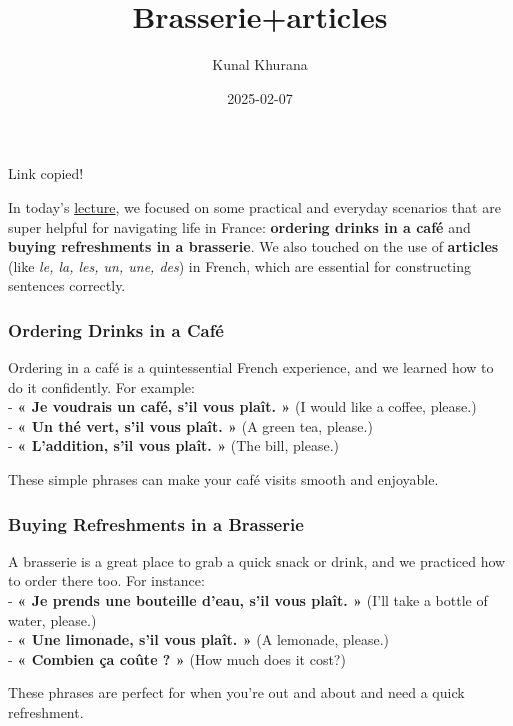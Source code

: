 \documentclass[
  16pt,
  letterpaper,
  DIV=11,
  numbers=noendperiod]{scrartcl}
\title{Brasserie+articles}
\author{Kunal Khurana}
\date{2025-02-07}
\begin{document}
\maketitle


\label{copy-message}{Link copied!}

\label{react-root}

In today's
\href{https://drive.google.com/file/d/1ESQ5L5H1BAVH96tB-sZq4b_lJrkGgsdO/view?usp=drive_link}{lecture},
we focused on some practical and everyday scenarios that are super
helpful for navigating life in France: \textbf{ordering drinks in a
café} and \textbf{buying refreshments in a brasserie}. We also touched
on the use of \textbf{articles} (like \emph{le, la, les, un, une, des})
in French, which are essential for constructing sentences correctly.

\subsubsection{Ordering Drinks in a
Café}\label{ordering-drinks-in-a-cafuxe9}

Ordering in a café is a quintessential French experience, and we learned
how to do it confidently. For example:\\
- \textbf{« Je voudrais un café, s'il vous plaît. »} (I would like a
coffee, please.)\\
- \textbf{« Un thé vert, s'il vous plaît. »} (A green tea, please.)\\
- \textbf{« L'addition, s'il vous plaît. »} (The bill, please.)

These simple phrases can make your café visits smooth and enjoyable.

\subsubsection{Buying Refreshments in a
Brasserie}\label{buying-refreshments-in-a-brasserie}

A brasserie is a great place to grab a quick snack or drink, and we
practiced how to order there too. For instance:\\
- \textbf{« Je prends une bouteille d'eau, s'il vous plaît. »} (I'll
take a bottle of water, please.)\\
- \textbf{« Une limonade, s'il vous plaît. »} (A lemonade, please.)\\
- \textbf{« Combien ça coûte ? »} (How much does it cost?)

These phrases are perfect for when you're out and about and need a quick
refreshment.
\end{document}
